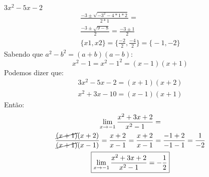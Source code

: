 \documentclass{jhwhw}
\begin{document}
\boldmath $3x^2 - 5x - 2$ \unboldmath 
\begin{multline*}
    \frac{-3 \pm \sqrt{-3^2-4*1*2}}{2*1} = \\ 
    \frac{-3 \pm \sqrt{9-8}}{2} = 
    \frac{-3\pm1}{2}\\
    \boxed{\{x1, x2\} = \biggl\{\frac{-2}{2}, \frac{-4}{2}\biggr\} = \biggl\{-1, -2\biggr\}}
\end{multline*}
Sabendo que $a^2 - b^2 = (a+b)(a-b)$:
\[x^2 - 1 = x^2 - 1^2 = (x-1)(x+1)\]
Podemos dizer que: 
\begin{gather*}
    3x^2 - 5x - 2 = (x+1)(x+2) \\ x^2 + 3x - 10 = (x-1)(x+1)
\end{gather*}
Então:
\begin{multline*}
    \lim_{x \to -1} \frac{x^2 + 3x + 2}{x^2 - 1} =\\ \frac{\cancel{(x+1)}(x+2)}{\cancel{(x+1)}(x-1)} = \frac{x+2}{x-1}
    = \frac{x+2}{x-1} = \frac{-1+2}{-1-1} = \frac{1}{-2} \\
    \boxed{\lim_{x \to -1} \frac{x^2 + 3x + 2}{x^2 - 1} = -\frac{1}{2}}
\end{multline*}
\end{document}

